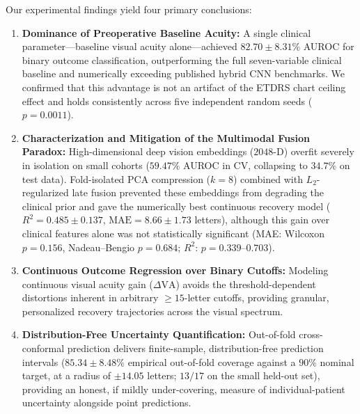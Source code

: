 \documentclass[preprint,12pt]{elsarticle}
\begin{document}
Our experimental findings yield four primary conclusions:
\begin{enumerate}
    \item \textbf{Dominance of Preoperative Baseline Acuity:} A single clinical parameter—baseline visual acuity alone—achieved $82.70 \pm 8.31\%$ AUROC for binary outcome classification, outperforming the full seven-variable clinical baseline and numerically exceeding published hybrid CNN benchmarks. We confirmed that this advantage is not an artifact of the ETDRS chart ceiling effect and holds consistently across five independent random seeds ($p = 0.0011$).
    \item \textbf{Characterization and Mitigation of the Multimodal Fusion Paradox:} High-dimensional deep vision embeddings ($2048$-D) overfit severely in isolation on small cohorts ($59.47\%$ AUROC in CV, collapsing to $34.7\%$ on test data). Fold-isolated PCA compression ($k=8$) combined with $L_2$-regularized late fusion prevented these embeddings from degrading the clinical prior and gave the numerically best continuous recovery model ($R^2 = 0.485 \pm 0.137$, $\text{MAE} = 8.66 \pm 1.73$ letters), although this gain over clinical features alone was not statistically significant (MAE: Wilcoxon $p=0.156$, Nadeau--Bengio $p=0.684$; $R^2$: $p=0.339$--$0.703$).
    \item \textbf{Continuous Outcome Regression over Binary Cutoffs:} Modeling continuous visual acuity gain ($\Delta\text{VA}$) avoids the threshold-dependent distortions inherent in arbitrary $\ge 15$-letter cutoffs, providing granular, personalized recovery trajectories across the visual spectrum.
    \item \textbf{Distribution-Free Uncertainty Quantification:} Out-of-fold cross-conformal prediction delivers finite-sample, distribution-free prediction intervals ($85.34 \pm 8.48\%$ empirical out-of-fold coverage against a $90\%$ nominal target, at a radius of $\pm 14.05$ letters; $13/17$ on the small held-out set), providing an honest, if mildly under-covering, measure of individual-patient uncertainty alongside point predictions.
\end{enumerate}
\end{document}
